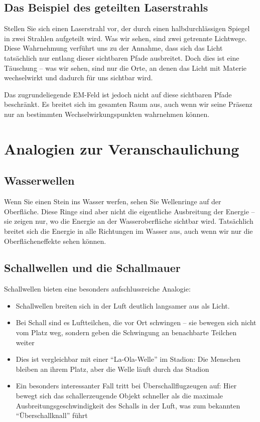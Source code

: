 \documentclass[12pt,a4paper]{article}
\begin{document}
	\subsection{Das Beispiel des geteilten Laserstrahls}
	Stellen Sie sich einen Laserstrahl vor, der durch einen halbdurchlässigen Spiegel in zwei Strahlen aufgeteilt wird. Was wir sehen, sind zwei getrennte Lichtwege. Diese Wahrnehmung verführt uns zu der Annahme, dass sich das Licht tatsächlich nur entlang dieser sichtbaren Pfade ausbreitet. Doch dies ist eine Täuschung -- was wir sehen, sind nur die Orte, an denen das Licht mit Materie wechselwirkt und dadurch für uns sichtbar wird.
	
	Das zugrundeliegende EM-Feld ist jedoch nicht auf diese sichtbaren Pfade beschränkt. Es breitet sich im gesamten Raum aus, auch wenn wir seine Präsenz nur an bestimmten Wechselwirkungspunkten wahrnehmen können.
	
	\section{Analogien zur Veranschaulichung}
	\subsection{Wasserwellen}
	Wenn Sie einen Stein ins Wasser werfen, sehen Sie Wellenringe auf der Oberfläche. Diese Ringe sind aber nicht die eigentliche Ausbreitung der Energie -- sie zeigen nur, wo die Energie an der Wasseroberfläche sichtbar wird. Tatsächlich breitet sich die Energie in alle Richtungen im Wasser aus, auch wenn wir nur die Oberflächeneffekte sehen können.
	
	\subsection{Schallwellen und die Schallmauer}
	Schallwellen bieten eine besonders aufschlussreiche Analogie:
	\begin{itemize}
		\item Schallwellen breiten sich in der Luft deutlich langsamer aus als Licht.
		\item Bei Schall sind es Luftteilchen, die vor Ort schwingen -- sie bewegen sich nicht vom Platz weg, sondern geben die Schwingung an benachbarte Teilchen weiter
		\item Dies ist vergleichbar mit einer ``La-Ola-Welle'' im Stadion: Die Menschen bleiben an ihrem Platz, aber die Welle läuft durch das Stadion
		\item Ein besonders interessanter Fall tritt bei Überschallflugzeugen auf: Hier bewegt sich das schallerzeugende Objekt schneller als die maximale Ausbreitungsgeschwindigkeit des Schalls in der Luft, was zum bekannten ``Überschallknall'' führt
	\end{itemize}
	
\end{document}
